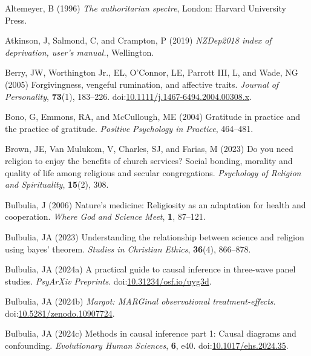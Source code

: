 \documentclass[
  single column]{article}
\newlength{\cslhangindent}
\newenvironment{CSLReferences}[2] %
 {\begin{list}{}{%
  \setlength{\itemindent}{0pt}
  \setlength{\leftmargin}{0pt}
  \setlength{\parsep}{0pt}
  \ifodd #1
   \setlength{\leftmargin}{\cslhangindent}
   \setlength{\itemindent}{-1\cslhangindent}
  \fi
  \setlength{\itemsep}{#2\baselineskip}}}
 {\end{list}}
\begin{document}
\label{refs}
\begin{CSLReferences}{1}{0}
Altemeyer, B (1996) \emph{The authoritarian spectre}, London: Harvard
University Press.

Atkinson, J, Salmond, C, and Crampton, P (2019) \emph{NZDep2018 index of
deprivation, user{'}s manual.}, Wellington.

Berry, JW, Worthington Jr., EL, O'Connor, LE, Parrott III, L, and Wade,
NG (2005) Forgivingness, vengeful rumination, and affective traits.
\emph{Journal of Personality}, \textbf{73}(1), 183--226.
doi:\href{https://doi.org/10.1111/j.1467-6494.2004.00308.x}{10.1111/j.1467-6494.2004.00308.x}.

Bono, G, Emmons, RA, and McCullough, ME (2004) Gratitude in practice and
the practice of gratitude. \emph{Positive Psychology in Practice},
464--481.

Brown, JE, Van Mulukom, V, Charles, SJ, and Farias, M (2023) Do you need
religion to enjoy the benefits of church services? Social bonding,
morality and quality of life among religious and secular congregations.
\emph{Psychology of Religion and Spirituality}, \textbf{15}(2), 308.

Bulbulia, J (2006) Nature's medicine: Religiosity as an adaptation for
health and cooperation. \emph{Where God and Science Meet}, \textbf{1},
87--121.

Bulbulia, JA (2023) Understanding the relationship between science and
religion using bayes' theorem. \emph{Studies in Christian Ethics},
\textbf{36}(4), 866--878.

Bulbulia, JA (2024a) A practical guide to causal inference in three-wave
panel studies. \emph{PsyArXiv Preprints}.
doi:\href{https://doi.org/10.31234/osf.io/uyg3d}{10.31234/osf.io/uyg3d}.

Bulbulia, JA (2024b) \emph{Margot: MARGinal observational
treatment-effects}.
doi:\href{https://doi.org/10.5281/zenodo.10907724}{10.5281/zenodo.10907724}.

Bulbulia, JA (2024c) Methods in causal inference part 1: Causal diagrams
and confounding. \emph{Evolutionary Human Sciences}, \textbf{6}, e40.
doi:\href{https://doi.org/10.1017/ehs.2024.35}{10.1017/ehs.2024.35}.


\end{CSLReferences}
\end{document}
